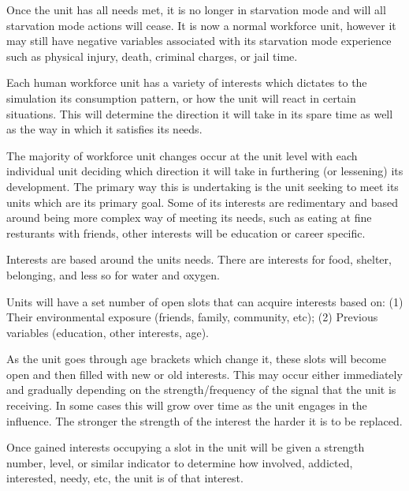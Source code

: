 Once the unit has all needs met, it is no longer in starvation mode and will all starvation mode actions will cease. It is now a normal workforce unit, however it may still have negative variables associated with its starvation mode experience such as physical injury, death, criminal charges, or jail time.  




Each human workforce unit has a variety of interests which dictates to the simulation its consumption pattern, or how the unit will react in certain situations. This will determine the direction it will take in its spare time as well as the way in which it satisfies its needs. 

The majority of workforce unit changes occur at the unit level with each individual unit deciding which direction it will take in furthering (or lessening) its development. The primary way this is undertaking is the unit seeking to meet its units which are its primary goal. Some of its interests are redimentary and based around being more complex way of meeting its needs, such as eating at fine resturants with friends, other interests will be education or career specific. 

Interests are based around the units needs. There are interests for food, shelter, belonging, and less so for water and oxygen.

Units will have a set number of open slots that can acquire interests based on: (1) Their environmental exposure (friends, family, community, etc); (2) Previous variables (education, other interests, age).


As the unit goes through age brackets which change it, these slots will become open and then filled with new or old interests. This may occur either immediately and gradually depending on the strength/frequency of the signal that the unit is receiving. In some cases this will grow over time as the unit engages in the influence. The stronger the strength of the interest the harder it is to be replaced.

Once gained interests occupying a slot in the unit will be given a strength number, level, or similar indicator to determine how involved, addicted, interested, needy, etc, the unit is of that interest. 

